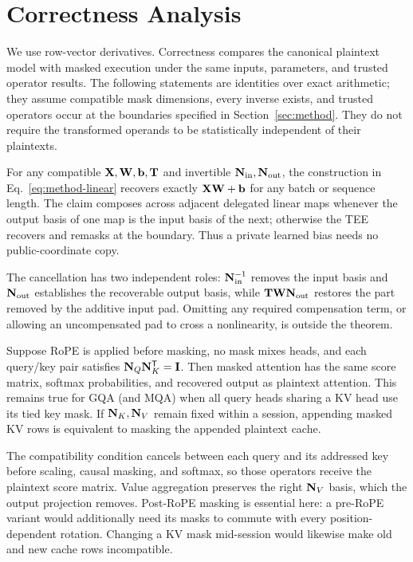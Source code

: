 \section{Correctness Analysis}
\label{sec:correctness}

We use row-vector derivatives.  Correctness compares the canonical plaintext
model with masked execution under the same inputs, parameters, and trusted
operator results.  The following statements are identities over exact
arithmetic; they assume compatible mask dimensions, every inverse exists, and
trusted operators occur
at the boundaries specified in Section~\ref{sec:method}.  They do not require
the transformed operands to be statistically independent of their plaintexts.

\begin{theorem}\label{thm:linear-execution}
For any compatible $\mathbf{X},\mathbf{W},\mathbf{b},\mathbf{T}$ and invertible $\mathbf{N}_{\mathrm{in}},\mathbf{N}_{\mathrm{out}}$, the
construction in Eq.~\eqref{eq:method-linear} recovers exactly
$\mathbf{X}\mathbf{W}+\mathbf{b}$ for any batch or sequence length.  The claim composes across
adjacent delegated linear maps whenever the output basis of one map is the
input basis of the next; otherwise the TEE recovers and remasks at the boundary.
Thus a private learned bias needs no public-coordinate copy.
\end{theorem}

The cancellation has two independent roles: $\mathbf{N}_{\mathrm{in}}^{-1}$ removes the input
basis and $\mathbf{N}_{\mathrm{out}}$ establishes the recoverable output basis, while
$\mathbf{T}\mathbf{W}\mathbf{N}_{\mathrm{out}}$ restores the part removed by the additive input pad.  Omitting
any required compensation term, or allowing an uncompensated pad to cross a
nonlinearity, is outside the theorem.

\begin{theorem}\label{thm:attention-cache}
Suppose RoPE is applied before masking, no mask mixes heads, and each query/key
pair satisfies $\mathbf{N}_{Q}\mathbf{N}_{K}^{\mathsf T}=\mathbf I$.  Then masked attention has the
same score matrix, softmax probabilities, and recovered output as plaintext
attention.  This remains true for GQA (and MQA) when all query heads sharing a
KV head use its tied key mask.  If $\mathbf{N}_{K},\mathbf{N}_{V}$ remain fixed within a session,
appending masked KV rows is equivalent to masking the appended plaintext cache.
\end{theorem}

The compatibility condition cancels between each query and its addressed key
before scaling, causal masking, and softmax, so those operators receive the
plaintext score matrix.  Value aggregation preserves the right $\mathbf{N}_{V}$ basis,
which the output projection removes.  Post-RoPE masking is essential here: a
pre-RoPE variant would additionally need its masks to commute with every
position-dependent rotation.  Changing a KV mask mid-session would likewise
make old and new cache rows incompatible.

